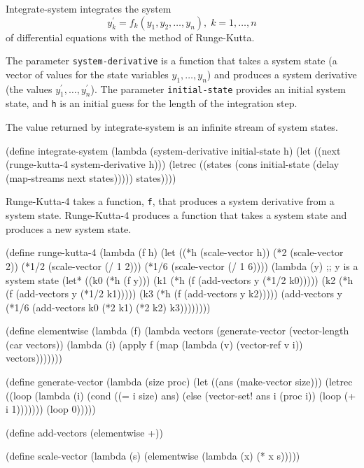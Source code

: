 

\nobreak
{\cf Integrate-system} integrates the system 
$$y_k^\prime = f_k(y_1, y_2, \ldots, y_n), \; k = 1, \ldots, n$$
of differential equations with the method of Runge-Kutta.

The parameter {\tt system-derivative} is a function that takes a system
state (a vector of values for the state variables $y_1, \ldots, y_n$)
and produces a system derivative (the values $y_1^\prime, \ldots,
y_n^\prime$).  The parameter {\tt initial-state} provides an initial
system state, and {\tt h} is an initial guess for the length of the
integration step.

The value returned by {\cf integrate-system} is an infinite stream of
system states.

\begin{schemenoindent}
(define integrate-system
  (lambda (system-derivative initial-state h)
    (let ((next (runge-kutta-4 system-derivative h)))
      (letrec ((states
                (cons initial-state
                      (delay (map-streams next
                                          states)))))
        states))))%
\end{schemenoindent}

{\cf Runge-Kutta-4} takes a function, {\tt f}, that produces a
system derivative from a system state.  {\cf Runge-Kutta-4}
produces a function that takes a system state and
produces a new system state.

\begin{schemenoindent}
(define runge-kutta-4
  (lambda (f h)
    (let ((*h (scale-vector h))
          (*2 (scale-vector 2))
          (*1/2 (scale-vector (/ 1 2)))
          (*1/6 (scale-vector (/ 1 6))))
      (lambda (y)
        ;; y {\rm{}is a system state}
        (let* ((k0 (*h (f y)))
               (k1 (*h (f (add-vectors y (*1/2 k0)))))
               (k2 (*h (f (add-vectors y (*1/2 k1)))))
               (k3 (*h (f (add-vectors y k2)))))
          (add-vectors y
            (*1/6 (add-vectors k0
                               (*2 k1)
                               (*2 k2)
                               k3))))))))

(define elementwise
  (lambda (f)
    (lambda vectors
      (generate-vector
        (vector-length (car vectors))
        (lambda (i)
          (apply f
                 (map (lambda (v) (vector-ref  v i))
                      vectors)))))))

(define generate-vector
  (lambda (size proc)
    (let ((ans (make-vector size)))
      (letrec ((loop
                (lambda (i)
                  (cond ((= i size) ans)
                        (else
                         (vector-set! ans i (proc i))
                         (loop (+ i 1)))))))
        (loop 0)))))

(define add-vectors (elementwise +))

(define scale-vector
  (lambda (s)
    (elementwise (lambda (x) (* x s)))))%
\end{schemenoindent}

